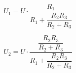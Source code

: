 \begin{description}
      \begin{equation}
        U_1 = U \cdot \dfrac{R_1}{R_1+ \dfrac{R_2 R_3}{R_2+R_3}}
      \end{equation}


      \begin{equation}
        U_2 = U \cdot \dfrac{\dfrac{R_2 R_3}{R_2+R_3}}{R_1 + \dfrac{R_2 R_3}{R_2+R_3}}
      \end{equation}
  \end{description}
